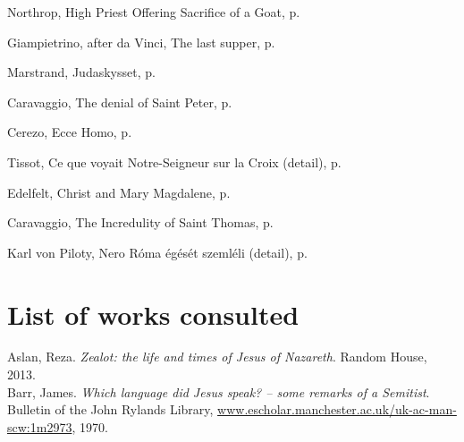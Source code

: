\documentclass[10pt,twoside]{article} %
\newcommand{\artcredit}[3]{#2, #3, p.~\pageref{fig:#1}}
\begin{document}
\artcredit{altar}{Northrop}{High Priest Offering Sacrifice of a Goat}

\artcredit{last-supper}{Giampietrino, after da Vinci}{The last supper}

\artcredit{judas-kiss}{Marstrand}{Judaskysset}

\artcredit{denial-of-saint-peter}{Caravaggio}{The denial of Saint Peter}

\artcredit{ecce-homo}{Cerezo}{Ecce Homo}

\artcredit{what-our-lord-saw-from-the-cross-detail}{Tissot}{Ce que voyait Notre-Seigneur sur la Croix (detail)}

\artcredit{resurrection-mary-magdalene}{Edelfelt}{Christ and Mary Magdalene}

\artcredit{doubting-thomas}{Caravaggio}{The Incredulity of Saint Thomas}

\artcredit{nero}{Karl von Piloty}{Nero Róma égését szemléli (detail)}

\vfill\pagebreak\section*{List of works consulted}

\newcommand{\refbook}[4]{#1. \emph{#2}. #3, #4.\\} %

\refbook{Aslan, Reza}{Zealot: the life and times of Jesus of Nazareth}{Random House}{2013}

\refbook{Barr, James}{Which language did Jesus speak? -- some remarks of a Semitist}{Bulletin of the John Rylands Library,
\url{www.escholar.manchester.ac.uk/uk-ac-man-scw:1m2973}}{1970}
\end{document}
